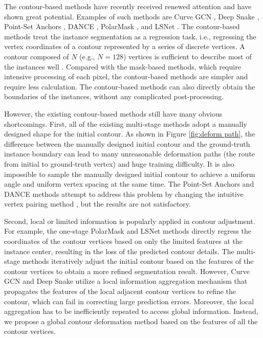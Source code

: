 \documentclass[10pt,twocolumn,letterpaper]{article}
\begin{document}
The contour-based methods have recently received renewed attention and have shown great potential. Examples of such methods are Curve GCN \cite{curvegcn}, Deep Snake \cite{deepsnake}, Point-Set Anchors \cite{pointset}, DANCE \cite{dance}, PolarMask \cite{polarmask}, and LSNet \cite{lsnet}. The contour-based methods treat the instance segmentation as a regression task, i.e., regressing the vertex coordinates of a contour represented by a series of discrete vertices. A contour composed of $N$ (e.g., $N=128$) vertices is sufficient to describe most of the instances well \cite{deepsnake}. Compared with the mask-based methods, which require intensive processing of each pixel, the contour-based methods are simpler and require less calculation. The contour-based methods can also directly obtain the boundaries of the instances, without any complicated post-processing.
 
However, the existing contour-based methods still have many obvious shortcomings. First, all of the existing multi-stage methods adopt a manually designed shape for the initial contour. As shown in Figure \ref{fig:deform path}, the difference between the manually designed initial contour and the ground-truth instance boundary can lead to many unreasonable deformation paths (the route from initial to ground-truth vertex) and huge training difficulty. It is also impossible to sample the manually designed initial contour to achieve a uniform angle and uniform vertex spacing at the same time. The Point-Set Anchors and DANCE methods attempt to address this problem by changing the intuitive vertex pairing method \cite{pointset, dance}, but the results are not satisfactory.

Second, local or limited information is popularly applied in contour adjustment. For example, the one-stage PolarMask \cite{polarmask} and LSNet \cite{lsnet} methods directly regress the coordinates of the contour vertices based on only the limited features at the instance center, resulting in the loss of the predicted contour details. The multi-stage methods iteratively adjust the initial contour based on the features of the contour vertices to obtain a more refined segmentation result. However, Curve GCN and Deep Snake utilize a local information aggregation mechanism that propagates the features of the local adjacent contour vertices to refine the contour, which can fail in correcting large prediction errors. Moreover, the local aggregation has to be inefficiently repeated to access global information. Instead, we propose a global contour deformation method based on the features of all the contour vertices.
\end{document}
